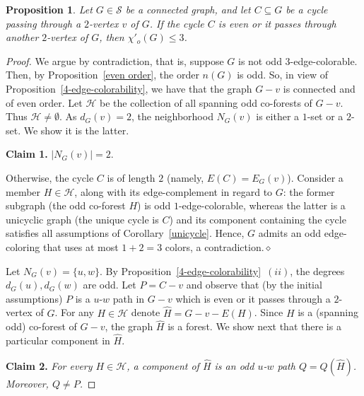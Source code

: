 \documentclass[a4paper,12pt]{article}
\newtheorem{proposition}[theorem]{Proposition}
\numberwithin{equation}{section}
\begin{document}
\begin{proposition}
    \label{sufficient condition 3-edge-colorability}
Let $G\in \mathcal{S}$ be a connected graph, and let $C\subseteq G$ be a cycle passing through a $2$-vertex $v$ of $G$. If the cycle $C$ is even or it passes through another $2$-vertex of $G$, then $\chi'_o(G)\leq 3$.
\end{proposition}
\begin{proof}
We argue by contradiction, that is, suppose $G$ is not odd $3$-edge-colorable. Then, by Proposition~\ref{even order}, the order $n(G)$ is odd. So, in view of Proposition~\ref{4-edge-colorability}, we have that the graph $G-v$ is connected and of even order. Let $\mathcal{H}$ be the collection of all spanning odd co-forests of $G-v$. Thus $\mathcal{H}\neq\emptyset$. As $d_G(v)=2$, the neighborhood $N_G(v)$ is either a $1$-set or a $2$-set. We show it is the latter.

\bigskip

\noindent \textbf{Claim 1.} $|N_G(v)|=2$.

\medskip

\noindent Otherwise, the cycle $C$ is of length $2$ (namely, $E(C)=E_G(v)$). Consider a member $H\in\mathcal{H}$, along with its edge-complement in regard to $G$: the former subgraph (the odd co-forest $H$) is odd $1$-edge-colorable, whereas the latter is a unicyclic graph (the unique cycle is $C$) and its component containing the cycle satisfies all assumptions of Corollary~\ref{unicycle}. Hence, $G$ admits an odd edge-coloring that uses at most $1+2=3$ colors, a contradiction.\hfill$\diamond$

\bigskip

Let $N_G(v)=\{u,w\}$. By Proposition~\ref{4-edge-colorability}~$(ii)$, the degrees $d_G(u),d_G(w)$ are odd. Let $P=C-v$ and observe that (by the initial assumptions) $P$ is a $u$-$w$ path in $G-v$ which is even or it passes through a $2$-vertex of $G$. For any $H\in\mathcal{H}$ denote $\widehat{H}=G-v-E(H)$. Since $H$ is a (spanning odd) co-forest of $G-v$, the graph $\widehat{H}$ is a forest. We show next that there is a particular component in $\widehat{H}$.

\bigskip

\noindent \textbf{Claim 2.} \textit{For every $H\in\mathcal{H}$, a component of $\widehat{H}$ is an odd $u$-$w$ path $Q=Q(\widehat{H})$. Moreover, $Q\neq P$.}

\medskip


\end{proof}
\end{document}
